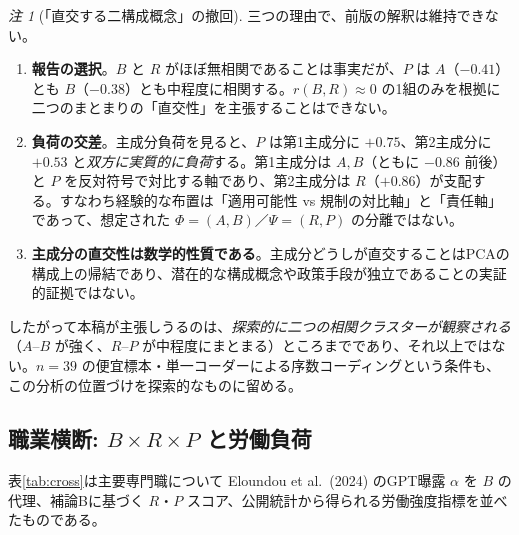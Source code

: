 \documentclass[11pt]{article}
\theoremstyle{plain}
\theoremstyle{definition}
\theoremstyle{remark}
\newtheorem*{rmk}{注}
\begin{document}
\begin{rmk}[「直交する二構成概念」の撤回]\label{rmk:pca}
三つの理由で、前版の解釈は維持できない。
\begin{enumerate}[label=(\roman*),leftmargin=1.8em,itemsep=1pt]
\item \textbf{報告の選択}。$B$ と $R$ がほぼ無相関であることは事実だが、$P$ は $A$（$-0.41$）とも $B$（$-0.38$）とも中程度に相関する。$r(B,R)\approx0$ の1組のみを根拠に二つのまとまりの「直交性」を主張することはできない。
\item \textbf{負荷の交差}。主成分負荷を見ると、$P$ は第1主成分に $+0.75$、第2主成分に $+0.53$ と\emph{双方に実質的に負荷}する。第1主成分は $A,B$（ともに $-0.86$ 前後）と $P$ を反対符号で対比する軸であり、第2主成分は $R$（$+0.86$）が支配する。すなわち経験的な布置は「適用可能性 vs 規制の対比軸」と「責任軸」であって、想定された $\Phi=(A,B)$／$\Psi=(R,P)$ の分離ではない。
\item \textbf{主成分の直交性は数学的性質である}。主成分どうしが直交することはPCAの構成上の帰結であり、潜在的な構成概念や政策手段が独立であることの実証的証拠ではない。
\end{enumerate}
したがって本稿が主張しうるのは、\emph{探索的に二つの相関クラスターが観察される}（$A$--$B$ が強く、$R$--$P$ が中程度にまとまる）ところまでであり、それ以上ではない。$n=39$ の便宜標本・単一コーダーによる序数コーディングという条件も、この分析の位置づけを探索的なものに留める。
\end{rmk}

\subsection{職業横断: $B\times R\times P$ と労働負荷}
表\ref{tab:cross}は主要専門職について Eloundou et al.\ (2024) のGPT曝露 $\alpha$ を $B$ の代理、補論Bに基づく $R$・$P$ スコア、公開統計から得られる労働強度指標を並べたものである。
\end{document}
